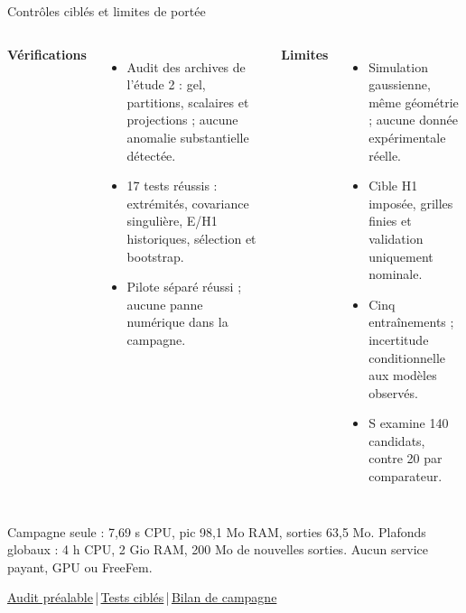 \documentclass[aspectratio=169,10pt]{beamer}
\newcommand{\src}[2]{\href{\DataURL{#1}}{#2}}
\begin{document}
\begin{frame}{Contrôles ciblés et limites de portée}
\begin{columns}[T]
\textbf{Vérifications}
\begin{itemize}
\item Audit des archives de l'étude 2 : gel, partitions, scalaires et projections ; aucune anomalie substantielle détectée.
\item 17 tests réussis : extrémités, covariance singulière, E/H1 historiques, sélection et bootstrap.
\item Pilote séparé réussi ; aucune panne numérique dans la campagne.
\end{itemize}
\textbf{Limites}
\begin{itemize}
\item Simulation gaussienne, même géométrie ; aucune donnée expérimentale réelle.
\item Cible H1 imposée, grilles finies et validation uniquement nominale.
\item Cinq entraînements ; incertitude conditionnelle aux modèles observés.
\item S examine 140 candidats, contre 20 par comparateur.
\end{itemize}
\end{columns}
\par\vspace{3mm}
\scriptsize Campagne seule : 7,69 s CPU, pic 98,1 Mo RAM, sorties 63,5 Mo. Plafonds globaux : 4 h CPU, 2 Gio RAM, 200 Mo de nouvelles sorties. Aucun service payant, GPU ou FreeFem.\par
\src{AUDIT_STUDY2.md}{Audit préalable}\,|\,\src{results/tests.json}{Tests ciblés}\,|\,\src{results/final/report.json}{Bilan de campagne}
\end{frame}
\end{document}
